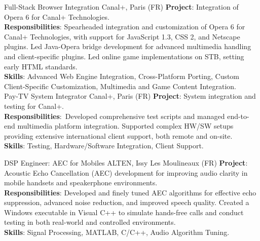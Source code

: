 \documentclass[
  a4paper,
   maincolor=cvblue,
   sectioncolor=cvblue,
]{fortysecondscv}
\begin{document}
\begin{cvtable}
    {Full-Stack Browser Integration}
    {Canal+,  Paris (FR)}
    {
      \textbf{Project}: Integration of Opera 6 for Canal+ Technologies.\\
      \textbf{Responsibilities}:
          Spearheaded integration and customization of Opera 6 for Canal+ Technologies, with support for JavaScript 1.3, CSS 2, and Netscape plugins. Led Java-Opera bridge development for advanced multimedia handling and client-specific plugins. Led online game implementations on STB, setting early HTML standards.\\
      \textbf{Skills}: Advanced Web Engine Integration, Cross-Platform Porting, Custom Client-Specific Customization, Multimedia and Game Content Integration.\\
    }
    {Pay-TV System Integrator}
    {Canal+,  Paris (FR)}
    {
      \textbf{Project}: System integration and testing for Canal+.\\
      \textbf{Responsibilities}:\
          Developed comprehensive test scripts and managed end-to-end multimedia platform integration.
          Supported complex HW/SW setups providing extensive international client support, both remote and on-site.\\
      \textbf{Skills}: Testing, Hardware/Software Integration, Client Support.\\
    }

    {DSP Engineer: AEC for Mobiles}
    {ALTEN, Issy Les Moulineaux (FR)}
    {
      \textbf{Project}: Acoustic Echo Cancellation (AEC) development for improving audio clarity in mobile handsets and speakerphone environments.\\
      \textbf{Responsibilities}:
          Developed and finely tuned AEC algorithms for effective echo suppression, advanced noise reduction, and improved speech quality. Created a Windows executable in Visual C++ to simulate hands-free calls and conduct testing in both real-world and controlled environments.\\
      \textbf{Skills}: Signal Processing, MATLAB, C/C++, Audio Algorithm Tuning.
    }


\end{cvtable}
\end{document}
